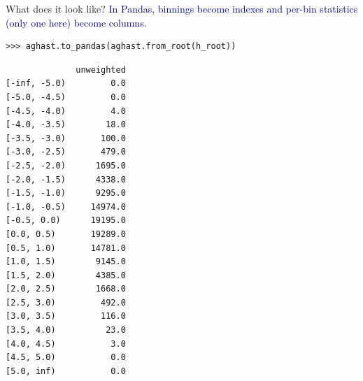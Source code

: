 \documentclass[aspectratio=169]{beamer}
\begin{document}
\begin{frame}[fragile]{What does it look like?}
\vspace{0.25 cm}
\small
\textcolor{darkblue}{In Pandas, binnings become indexes and per-bin statistics (only one here) become columns.}
\begin{verbatim}
>>> aghast.to_pandas(aghast.from_root(h_root))
\end{verbatim}

\tiny
\begin{verbatim}
              unweighted
[-inf, -5.0)         0.0
[-5.0, -4.5)         0.0
[-4.5, -4.0)         4.0
[-4.0, -3.5)        18.0
[-3.5, -3.0)       100.0
[-3.0, -2.5)       479.0
[-2.5, -2.0)      1695.0
[-2.0, -1.5)      4338.0
[-1.5, -1.0)      9295.0
[-1.0, -0.5)     14974.0
[-0.5, 0.0)      19195.0
[0.0, 0.5)       19289.0
[0.5, 1.0)       14781.0
[1.0, 1.5)        9145.0
[1.5, 2.0)        4385.0
[2.0, 2.5)        1668.0
[2.5, 3.0)         492.0
[3.0, 3.5)         116.0
[3.5, 4.0)          23.0
[4.0, 4.5)           3.0
[4.5, 5.0)           0.0
[5.0, inf)           0.0
\end{verbatim}
\end{frame}

\end{document}

